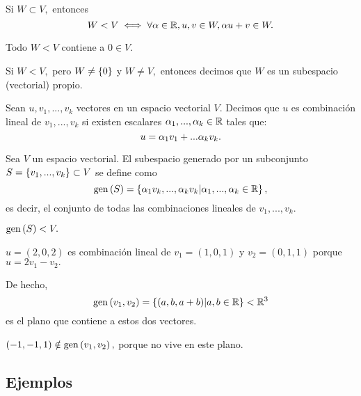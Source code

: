 \begin{prop}
 Si $W\subset V,$ entonces $$
W < V \iff \forall \alpha \in \mathbb{R}, u,v \in W, \alpha u+v\in W.
 $$
\end{prop}

\begin{cor}
 Todo $W < V$ contiene a $0 \in V.$
\end{cor}


\begin{defn}
 Si $W< V,$ pero $W\neq\left\{ 0 \right\}$ y $W\neq V,$ entonces decimos que $W$ es un subespacio (vectorial) propio.
\end{defn}

\begin{defn}
 Sean $u,v_{1},...,v_{k}$ vectores en un espacio vectorial $V.$ Decimos que $u$ es combinaci\'on lineal de
$v_{1},...,v_{k}$ si existen escalares $\alpha_{1},...,\alpha_{k}\in \mathbb{R}$ tales que:
$$
u=\alpha_{1}v_{1}+...\alpha_{k}v_{k}.
$$
\end{defn}

\begin{defn}
 Sea $V$ un espacio vectorial. El subespacio generado por un subconjunto $S=\left\{ v_{1},...,v_{k} \right\}\subset V$ se define
como
 $$
\operatorname{gen}\left( S \right)=\left\{ \alpha_{1}v_{k},...,\alpha_{k}v_{k}\arrowvert \alpha_{1},...,\alpha_{k}\in \mathbb{R} \right\},
 $$
 es decir, el conjunto de todas las combinaciones lineales de $v_{1},...,v_{k}.$
\end{defn}

\begin{rem}
 $\operatorname{gen}\left( S \right)<V.$
\end{rem}


\begin{problema}
 $u=(2,0,2)$ es combinaci\'on lineal de $v_{1}=(1,0,1)$ y $v_{2}=(0,1,1)$ porque $u=2v_{1}-v_{2}.$

 De hecho, $$\operatorname{gen}\left( v_{1},v_{2} \right)=\left\{ (a,b,a+b)\arrowvert a,b \in \mathbb{R} \right\}<\mathbb{R}^{3}$$ es el plano que contiene a estos dos vectores.

 $(-1,-1,1)\notin \operatorname{gen}\left( v_{1},v_{2} \right),$ porque no vive en este plano.
\end{problema}





\subsection*{Ejemplos}


